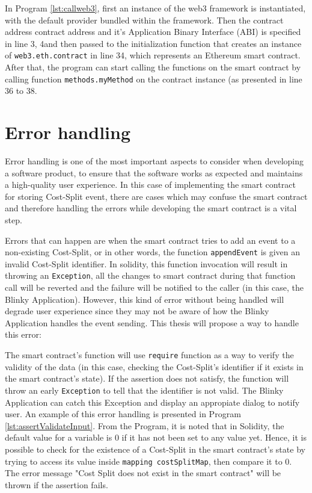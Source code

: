 \documentclass[twoside,draftfooter]{tutthesis} %
\begin{document}
In Program \ref{lst:callweb3}, first an instance of the web3 framework is instantiated, with the default provider bundled within the framework. Then the contract address contract address and it's Application Binary Interface (ABI) is specified in line 3, 4and then passed to the initialization function that creates an instance of \texttt{web3.eth.contract} in line 34, which represents an Ethereum smart contract. After that, the program can start calling the functions on the smart contract by calling function \texttt{methods.myMethod} on the contract instance (as presented in line 36 to 38.

\section{Error handling}

Error handling is one of the most important aspects to consider when developing a software product, to ensure that the software works as expected and maintains a high-quality user experience. In this case of implementing the smart contract for storing Cost-Split event, there are cases which may confuse the smart contract and therefore handling the errors while developing the smart contract is a vital step.

Errors that can happen are when the smart contract tries to add an event to a non-existing Cost-Split, or in other words, the function \texttt{appendEvent} is given an invalid Cost-Split identifier. In solidity, this function invocation will result in throwing an \texttt{Exception}, all the changes to smart contract during that function call will be reverted and the failure will be notified to the caller (in this case, the Blinky Application). However, this kind of error without being handled will degrade user experience since they may not be aware of how the Blinky Application handles the event sending. This thesis will propose a way to handle this error:

 The smart contract's function will use \texttt{require} function as a way to verify the validity of the data (in this case, checking the Cost-Split's identifier if it exists in the smart contract's state). If the assertion does not satisfy, the function will throw an early \texttt{Exception} to tell that the identifier is not valid. The Blinky Application can catch this Exception and display an appropiate dialog to notify user. An example of this error handling is presented in Program \ref{lst:assertValidateInput}. From the Program, it is noted that in Solidity, the default value for a variable is 0 if it has not been set to any value yet. Hence, it is possible to check for the existence of a Cost-Split in the smart contract's state by trying to access its value inside \texttt{mapping costSplitMap}, then compare it to 0. The error message "Cost Split does not exist in the smart contract" will be thrown if the assertion fails.
\end{document}
